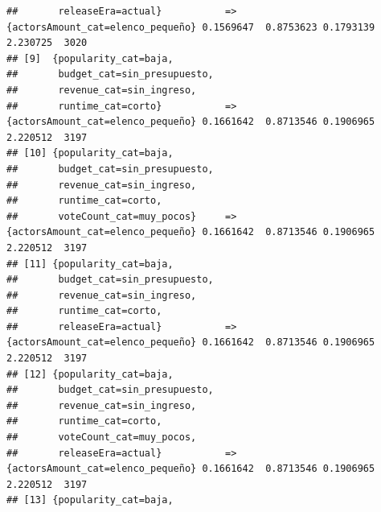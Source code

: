 \documentclass[
]{article}
\begin{document}
\begin{verbatim}
##       releaseEra=actual}           => {actorsAmount_cat=elenco_pequeño} 0.1569647  0.8753623 0.1793139 2.230725  3020
## [9]  {popularity_cat=baja,                                                                                           
##       budget_cat=sin_presupuesto,                                                                                    
##       revenue_cat=sin_ingreso,                                                                                       
##       runtime_cat=corto}           => {actorsAmount_cat=elenco_pequeño} 0.1661642  0.8713546 0.1906965 2.220512  3197
## [10] {popularity_cat=baja,                                                                                           
##       budget_cat=sin_presupuesto,                                                                                    
##       revenue_cat=sin_ingreso,                                                                                       
##       runtime_cat=corto,                                                                                             
##       voteCount_cat=muy_pocos}     => {actorsAmount_cat=elenco_pequeño} 0.1661642  0.8713546 0.1906965 2.220512  3197
## [11] {popularity_cat=baja,                                                                                           
##       budget_cat=sin_presupuesto,                                                                                    
##       revenue_cat=sin_ingreso,                                                                                       
##       runtime_cat=corto,                                                                                             
##       releaseEra=actual}           => {actorsAmount_cat=elenco_pequeño} 0.1661642  0.8713546 0.1906965 2.220512  3197
## [12] {popularity_cat=baja,                                                                                           
##       budget_cat=sin_presupuesto,                                                                                    
##       revenue_cat=sin_ingreso,                                                                                       
##       runtime_cat=corto,                                                                                             
##       voteCount_cat=muy_pocos,                                                                                       
##       releaseEra=actual}           => {actorsAmount_cat=elenco_pequeño} 0.1661642  0.8713546 0.1906965 2.220512  3197
## [13] {popularity_cat=baja,                                                                                           

\end{verbatim}
\end{document}
